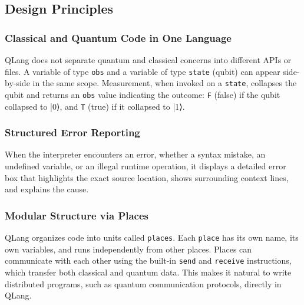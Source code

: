 
\subsection{Design Principles}\label{sec:design-principles}
\subsubsection{Classical and Quantum Code in One Language}
QLang does not separate quantum and classical concerns into different APIs or
files. A variable of type \texttt{obs} and a variable of
type \texttt{state} (qubit) can appear side-by-side in the same scope.
Measurement, when invoked on a \texttt{state}, collapses the qubit and returns an 
\texttt{obs} value indicating the outcome: \texttt{F} (false) if the qubit collapsed to |0⟩, 
and \texttt{T} (true) if it collapsed to |1⟩.
\subsubsection{Structured Error Reporting} 
When the interpreter encounters an error, whether a syntax mistake, an
undefined variable, or an illegal runtime operation, it displays a detailed
error box that highlights the exact source location, shows surrounding context
lines, and explains the cause.
\subsubsection{Modular Structure via Places}
QLang organizes code into units called \texttt{places}. Each \texttt{place} has its own 
name, its own variables, and runs independently from other places. Places can communicate 
with each other using the built-in \texttt{send} and \texttt{receive} instructions, which 
transfer both classical and quantum data. This makes it natural to write distributed 
programs, such as quantum communication protocols, directly in QLang.